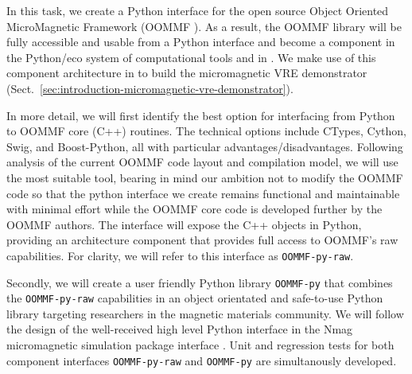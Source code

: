 \begin{workpackage}[id=component-architecture,wphases=0-48!.5,
  title=Component Architecture,lead=UV,
  PSRM=50,UVRM=8,SARM=16, USORM=6, UORM=4, LLRM=14, UJFRM=6, UGRM=14]
\begin{tasklist}
\begin{task}[lead=USO,id=oommf-python-interface,title=Python interface for OOMMF micromagnetic simulation library,PM=6,wphases=7-13,partners={SA}]
  In this task, we create a Python interface
  for the open source Object
  Oriented MicroMagnetic Framework (OOMMF \cite{OOMMF-url}).
  As a result, the OOMMF library will be fully accessible and usable
  from a Python interface and become a component in the
  Python/\Jupyter eco system of computational tools and in
  \TheProject. We make use of this component architecture in
   to build the micromagnetic
  VRE demonstrator
  (Sect.~\ref{sec:introduction-micromagnetic-vre-demonstrator}).

  In more detail, we will first identify the best option for interfacing
  from Python to OOMMF core (C++) routines. The technical options
  include CTypes, Cython, Swig, and Boost-Python, all with particular
  advantages/disadvantages. Following analysis of the current OOMMF
  code layout and compilation model, we will use the most suitable
  tool, bearing in mind our ambition not to modify the OOMMF code so
  that the python interface we create remains functional and
  maintainable with minimal effort while the OOMMF core code is
  developed further by the OOMMF authors. 
  The interface will expose the C++ objects in Python, providing
  an architecture component that provides full access to OOMMF's
  raw capabilities. For clarity, we will refer to this interface as
  \texttt{OOMMF-py-raw}. %

  Secondly, we will create a user friendly Python library
  \texttt{OOMMF-py} that combines the \texttt{OOMMF-py-raw}
  capabilities in an object orientated and safe-to-use Python library
  targeting researchers in the magnetic materials community. We will
  follow the design of the well-received high level Python interface
  in the Nmag micromagnetic simulation package \cite{Fischbacher2007a}
  interface \cite{Nmag-url}. Unit and regression tests for both
  component interfaces \texttt{OOMMF-py-raw} and \texttt{OOMMF-py} are
  simultanously developed.



\end{task}
\end{tasklist}
\end{workpackage}
